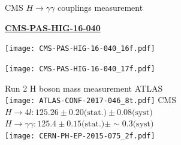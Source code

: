 \begin{frame}{CMS $H\rightarrow \gamma\gamma$ couplings measurement}

  \begin{center} \href{https://cds.cern.ch/record/2264515}{\bf CMS-PAS-HIG-16-040} \end{center}
  
  \begin{minipage}{0.49\linewidth}
    \texttt{[image: CMS-PAS-HIG-16-040\_16f.pdf]}
  \end{minipage}
  \hfill
  \begin{minipage}{0.49\linewidth}
    \texttt{[image: CMS-PAS-HIG-16-040\_17f.pdf]}
    \end{minipage}
\end{frame}

\begin{frame}{Run 2 H boson mass measurement}
  \centering
    ATLAS\\
    \texttt{[image: ATLAS-CONF-2017-046\_8t.pdf]}
    \vfill
    CMS\\
    $H\rightarrow 4l : 125.26 \pm 0.20 \text{(stat.)} \pm 0.08 \text{(syst)}$ \\
    $H\rightarrow \gamma\gamma : 125.4 \pm 0.15 \text{(stat.)} \pm \sim 0.3 \text{(syst)}$ \\
    \texttt{[image: CERN-PH-EP-2015-075\_2f.pdf]}

\end{frame}
